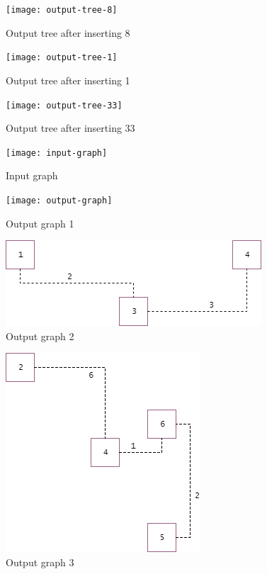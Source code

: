 \documentclass {article}
\begin{document}
\begin{figure}[H]
\texttt{[image: output-tree-8]}

\caption{Output tree after inserting 8}
\label{fig:output-tree-8}
\end{figure}

\begin{figure}[H]
\texttt{[image: output-tree-1]}

\caption{Output tree after inserting 1}
\label{fig:output-tree-1}
\end{figure}

\begin{figure}[H]
\texttt{[image: output-tree-33]}

\caption{Output tree after inserting 33}
\label{fig:output-tree-33}
\end{figure}

\begin{figure}[H]
\texttt{[image: input-graph]}

\caption{Input graph}
\label{fig:input-graph}
\end{figure}

\begin{figure}[H]
\texttt{[image: output-graph]}

\caption{Output graph 1}
\label{fig:output-graph}
\end{figure}

\begin{figure}[H]
\includegraphics[width=\textwidth]{output-graph2}

\caption{Output graph 2}
\label{fig:output-graph2}
\end{figure}

\begin{figure}[H]
\includegraphics[width=\textwidth]{output-graph3}

\caption{Output graph 3}
\label{fig:output-graph3}
\end{figure}
\end{document}
